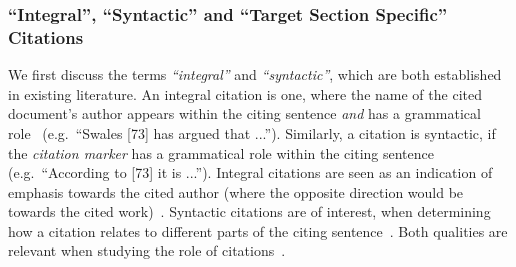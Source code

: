 \subsubsection{``Integral'', ``Syntactic'' and ``Target Section Specific'' Citations}\label{sec:termdefs}
We first discuss the terms \emph{``integral''} and \emph{``syntactic''}, which are both established in existing literature. An integral citation is one, where the name of the cited document's author appears within the citing sentence \emph{and} has a grammatical role~\cite{Swales1990,Hyland1999} (e.g.\ ``Swales [73] has argued that ...''). Similarly, a citation is syntactic, if the \emph{citation marker} has a grammatical role within the citing sentence~\cite{Whidby2011,Abujbara2012} (e.g.\ ``According to [73] it is ...''). Integral citations are seen as an indication of emphasis towards the cited author (where the opposite direction would be towards the cited work)~\cite{Swales1990,Hyland1999}. Syntactic citations are of interest, when determining how a citation relates to different parts of the citing sentence~\cite{Whidby2011,Abujbara2012}. Both qualities are relevant when studying the role of citations~\cite{Faerber2019TPDL}.

